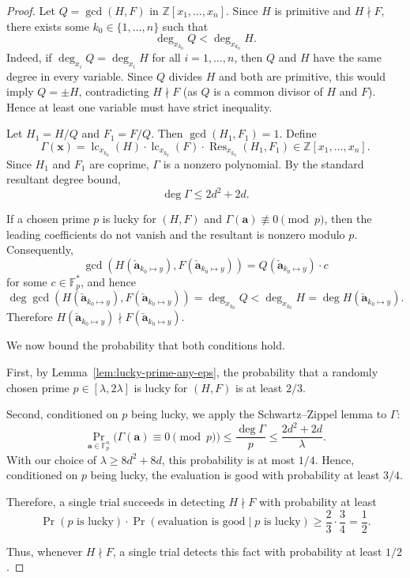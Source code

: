 \documentclass{article}
\numberwithin{equation}{section}
\begin{document}
\begin{proof}
Let $Q = \gcd(H, F)$ in $\mathbb{Z}[x_1,\dots,x_n]$. Since $H$ is primitive and $H \nmid F$, there exists some $k_0 \in \{1,\dots,n\}$ such that
\[
\deg_{x_{k_0}} Q < \deg_{x_{k_0}} H.
\]
Indeed, if $\deg_{x_i} Q = \deg_{x_i} H$ for all $i=1,\dots,n$, then $Q$ and $H$ have the same degree in every variable. Since $Q$ divides $H$ and both are primitive, this would imply $Q = \pm H$, contradicting $H \nmid F$ (as $Q$ is a common divisor of $H$ and $F$). Hence at least one variable must have strict inequality.

Let $H_1 = H/Q$ and $F_1 = F/Q$. Then $\gcd(H_1, F_1) = 1$. Define
\[
\Gamma(\mathbf{x}) = \operatorname{lc}_{x_{k_0}}(H) \cdot \operatorname{lc}_{x_{k_0}}(F) \cdot \operatorname{Res}_{x_{k_0}}(H_1, F_1) \in \mathbb{Z}[x_1,\dots,x_n].
\]
Since $H_1$ and $F_1$ are coprime, $\Gamma$ is a nonzero polynomial. By the standard resultant degree bound,
\[
\deg \Gamma \le 2d^2 + 2d.
\]

If a chosen prime $p$ is lucky for $(H, F)$ and $\Gamma(\mathbf{a}) \not\equiv 0 \pmod{p}$, then the leading coefficients do not vanish and the resultant is nonzero modulo $p$. Consequently,
\[
\gcd(H(\mathbf{\check{a}}_{k_0 \mapsto y}), F(\mathbf{\check{a}}_{k_0 \mapsto y}))
= Q(\mathbf{\check{a}}_{k_0 \mapsto y}) \cdot c
\]
for some $c \in \mathbb{F}_p^*$, and hence
\[
\deg \gcd(H(\mathbf{\check{a}}_{k_0 \mapsto y}), F(\mathbf{\check{a}}_{k_0 \mapsto y}))
= \deg_{x_{k_0}} Q
< \deg_{x_{k_0}} H
= \deg H(\mathbf{\check{a}}_{k_0 \mapsto y}).
\]
Therefore $H(\mathbf{\check{a}}_{k_0 \mapsto y}) \nmid F(\mathbf{\check{a}}_{k_0 \mapsto y})$.

We now bound the probability that both conditions hold.

First, by Lemma~\ref{lem:lucky-prime-any-eps}, the probability that a randomly chosen prime $p \in [\lambda, 2\lambda]$ is lucky for $(H, F)$ is at least $2/3$.

Second, conditioned on $p$ being lucky, we apply the Schwartz--Zippel lemma to $\Gamma$:
\[
\Pr_{\mathbf{a} \in \mathbb{F}_p^n}\bigl(\Gamma(\mathbf{a}) \equiv 0 \pmod{p}\bigr)
\le \frac{\deg \Gamma}{p}
\le \frac{2d^2 + 2d}{\lambda}.
\]
With our choice of $\lambda \ge 8d^2 + 8d$, this probability is at most $1/4$. Hence, conditioned on $p$ being lucky, the evaluation is good with probability at least $3/4$.

Therefore, a single trial succeeds in detecting $H \nmid F$ with probability at least
\[
\Pr(p \text{ is lucky}) \cdot \Pr(\text{evaluation is good} \mid p \text{ is lucky})
\ge \frac{2}{3} \cdot \frac{3}{4}
= \frac{1}{2}.
\]

Thus, whenever $H \nmid F$, a single trial detects this fact with probability at least $1/2$.
\end{proof}
\end{document}
